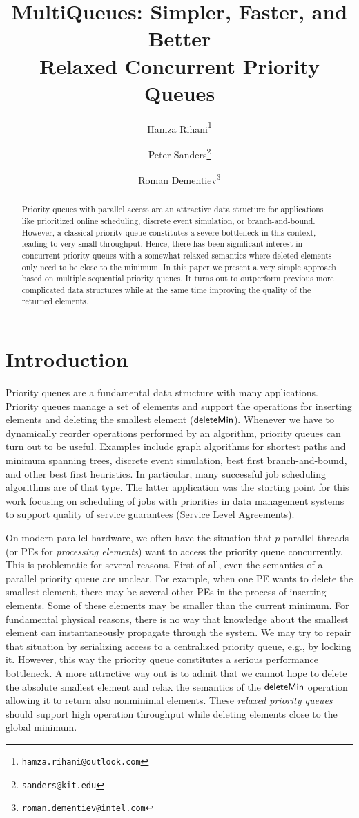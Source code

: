\documentclass[a4paper,12pt]{article}
\title{MultiQueues: Simpler, Faster, and Better\\ Relaxed Concurrent Priority Queues}
\author[1]{Hamza Rihani\thanks{\tt hamza.rihani@outlook.com}}
\author[2]{Peter Sanders\thanks{{\tt sanders@kit.edu}}}
\author[3]{Roman Dementiev\thanks{{\tt roman.dementiev@intel.com}}}
\affil[1]{Universit\'e Joseph Fourier Grenoble, France}
\affil[2]{Karlsruhe Institute of Technology, Germany}
\affil[3]{Intel GmbH Munich, Germany}
\newcommand{\Id}[1]{\ensuremath{\text{{\sf #1}}}}
\begin{document}
\maketitle
\pagestyle{plain}

\begin{abstract}
Priority queues with parallel access are an attractive data structure for applications like prioritized online scheduling, discrete event simulation, or branch-and-bound. However, a classical priority queue constitutes a severe bottleneck in this context, leading to very small throughput. Hence, there has been significant interest in concurrent priority queues with a somewhat relaxed semantics where deleted elements only need to be close to the minimum. In this paper
we present a very simple approach based on multiple sequential priority queues.
It turns out to outperform previous more complicated data structures while at the same time improving the quality of the returned elements.
\end{abstract}

\section{Introduction}
\label{s:intro}

Priority queues are a fundamental data structure with many applications.
Priority queues manage a set of elements and support the operations for inserting elements and deleting the smallest element (\Id{deleteMin}).
Whenever we have to dynamically reorder operations performed by an algorithm, priority queues can turn out to be useful. Examples include graph algorithms for shortest paths and minimum spanning trees, discrete event simulation, best first branch-and-bound, and other best first heuristics. In particular, many successful job scheduling algorithms are of that type. The latter application was the starting point for this work focusing on scheduling of jobs with priorities in data management systems to support quality of service guarantees (Service Level Agreements).

On modern parallel hardware, we often have the situation that $p$ parallel threads (or PEs for \emph{processing   elements}) want to access the priority queue concurrently. This is problematic for several reasons. First of all, even the semantics of a parallel priority queue are unclear. For example, when one PE wants to delete the smallest element, there may be several other PEs in the process of inserting elements. Some of these elements may be smaller than the current minimum. For fundamental physical reasons, there is no way that knowledge about the smallest element can instantaneously propagate through the system. We may try to repair that situation by serializing access to a centralized priority queue, e.g., by locking it. However, this way the priority queue constitutes a serious performance bottleneck. A more attractive way out is to admit that we cannot hope to delete the absolute smallest element and relax the semantics of the \Id{deleteMin} operation allowing it to return also nonminimal elements. These \emph{relaxed priority queues} should support high operation throughput while deleting elements close to the global minimum. 
\end{document}
